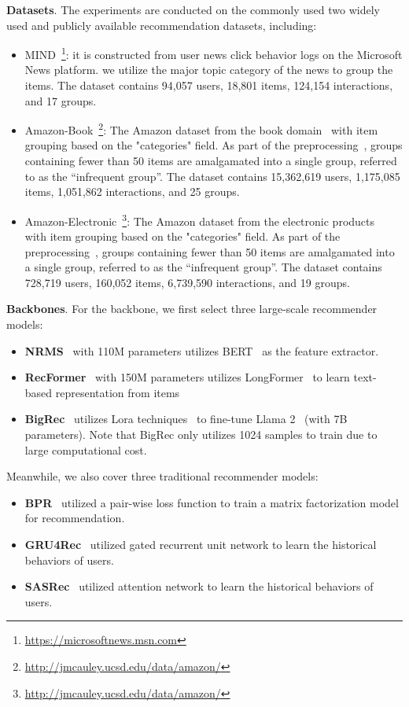 \textbf{Datasets}. The experiments are conducted on the commonly used two widely used and publicly available recommendation datasets, including: 
\begin{itemize}
    \item MIND~\citep{wu2020mind}\footnote{\url{https://microsoftnews.msn.com}}: it is constructed from user news click behavior logs on the Microsoft News platform. we utilize the major topic category of the news to group the items. The dataset contains 94,057 users, 18,801 items, 124,154 interactions, and 17 groups.
    \item Amazon-Book~\footnote{\url{http://jmcauley.ucsd.edu/data/amazon/}}: 
The Amazon dataset from the book domain~\citep{he2016ups} with item grouping based on the "categories" field. As part of the preprocessing~\citep{xu2024fairsync}, groups containing fewer than 50 items are amalgamated into a single group, referred to as the ``infrequent group''. The dataset contains 15,362,619 users, 1,175,085 items, 1,051,862 interactions, and 25 groups.
    \item Amazon-Electronic~\footnote{\url{http://jmcauley.ucsd.edu/data/amazon/}}: 
The Amazon dataset from the electronic products~\citep{he2016ups} with item grouping based on the "categories" field. As part of the preprocessing~\citep{xu2024fairsync}, groups containing fewer than 50 items are amalgamated into a single group, referred to as the ``infrequent group''. The dataset contains 728,719 users, 160,052 items, 6,739,590 interactions, and 19 groups.
\end{itemize}

\textbf{Backbones}. For the backbone, we first select three large-scale recommender models:
\begin{itemize}
    \item \textbf{NRMS}~\citep{wu-etal-2019-neural-news} with 110M parameters utilizes BERT~\citep{devlin2018bert} as the feature extractor.
    \item \textbf{RecFormer}~\citep{Recformer} with 150M parameters utilizes LongFormer~\citep{beltagy2020longformer} to learn text-based representation from items
    \item \textbf{BigRec}~\citep{bao2023bi} utilizes Lora techniques~\citep{hu2021lora} to fine-tune Llama 2~\citep{touvron2023llama} (with 7B parameters). Note that BigRec only utilizes 1024 samples to train due to large computational cost.
\end{itemize}

Meanwhile, we also cover three traditional recommender models:
\begin{itemize}
    \item \textbf{BPR}~\cite{BPR} utilized a pair-wise loss function to train a matrix factorization model for recommendation.
    \item \textbf{GRU4Rec}~\cite{gru4rec} utilized gated recurrent unit network to learn the historical behaviors of users.
    \item \textbf{SASRec}~\cite{SASRec} utilized attention network to learn the historical behaviors of users.
\end{itemize}

